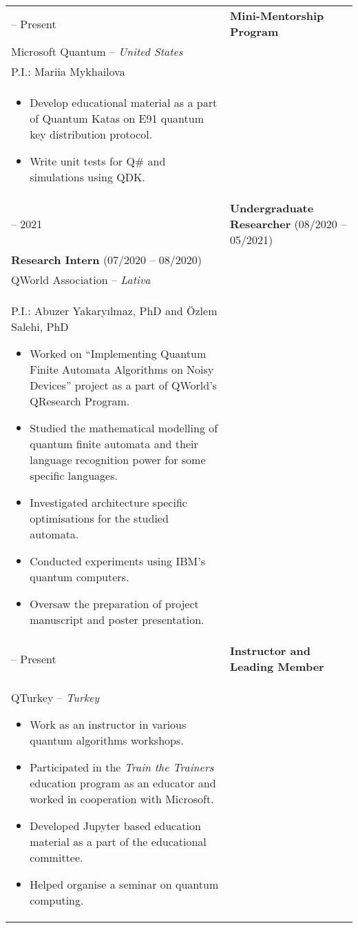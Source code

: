 \documentclass[11pt]{article}
\makeatletter
\newlength{\firstColumnWidth}
\newlength{\tabusep}
\newenvironment{twocols}
    {
    \begin{longtable}[h]{%
        @{}%
        >{\raggedleft}p{\firstColumnWidth}%
        @{\hspace{\tabusep}}%
        >{\arraybackslash\raggedright}p{\dimexpr %
            \linewidth-\firstColumnWidth-\tabusep%
        \relax}%
        @{}%
        }
    } {
        \end{longtable}
    }
\makeatother
\begin{document}
\begin{twocols}
  2021 -- Present & 
    \textbf{Mini-Mentorship Program} \\
    Microsoft Quantum -- \textit{United States} \\
    P.I.: Mariia Mykhailova \\
    \begin{itemize}
      \item Develop educational material as a part of Quantum Katas on E91 quantum key distribution protocol.
      \item Write unit tests for Q\# and simulations using QDK. 
    \end{itemize} \tabularnewline
  2020 -- 2021 & 
    \textbf{Undergraduate Researcher} (08/2020 -- 05/2021)\\
    \textbf{Research Intern} (07/2020 -- 08/2020)\\
    QWorld Association -- \textit{Lativa}\\
    P.I.: Abuzer Yakaryılmaz, PhD and Özlem Salehi, PhD
    \begin{itemize}
        \item Worked on “Implementing Quantum Finite Automata Algorithms on Noisy Devices” project as a part of QWorld's QResearch Program.
        \item Studied the mathematical modelling of quantum finite automata and their language recognition power for some specific languages.
        \item Investigated architecture specific optimisations for the studied automata.
        \item Conducted experiments using IBM's quantum computers.
        \item Oversaw the preparation of project manuscript and poster presentation.
    \end{itemize} \tabularnewline
    2019 -- Present & 
    \textbf{Instructor and Leading Member} \\
    QTurkey -- \textit{Turkey}
    \begin{itemize}
        \item Work as an instructor in various quantum algorithms workshops.
        \item Participated in the \emph{Train the Trainers} education program as an educator and worked in cooperation with Microsoft.
        \item Developed Jupyter based education material as a part of the educational committee.
        \item Helped organise a seminar on quantum computing.
    \end{itemize}
\end{twocols}
\end{document}
